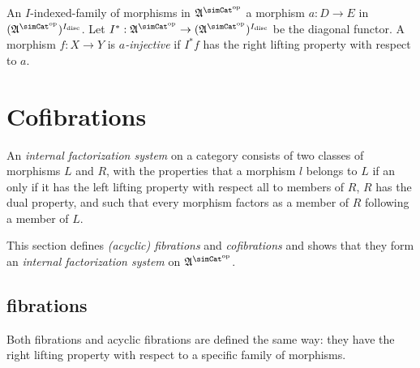 \documentclass{tac}
\newcommand\hide[1]{}
\newcommand\ri{^*}
\newcommand\dual{^{\mathrm{op}}}
\newcommand\disc{_{\mathrm{disc}}}
\newcommand\s{^{\simCat\dual}}
\newcommand\of{:}
\newcommand\ambient{\mathfrak A}
\begin{document}
\hide{
New idea: everything follows form the projectivity of added faces.

We don't need the object of realizers anymore either.

Explain $I\ri\of\ambient\s\to (\ambient\s)^{I\disc}$ somewhere. It should be an internal simplicial object of the slice category. i.e. $(\ambient/I)\s$. 
}
\begin{definition}[Injective] An $I$-indexed-family of morphisms in $\ambient\s$ a morphism $a\of D\to E$ in $(\ambient\s)^{I\disc}$. Let $I\ri\of\ambient\s\to (\ambient\s)^{I\disc}$ be the diagonal functor. A morphism $f\of X\to Y$ is \emph{$a$-injective} if $I\ri f$ has the right lifting property with respect to $a$.
\end{definition}


\section{Cofibrations}%

\begin{definition} An \emph{internal factorization system} on a category consists of two classes of morphisms $L$ and $R$, with the properties that a morphism $l$ belongs to $L$ if an only if it has the left lifting property with respect all to members of $R$, $R$ has the dual property, and such that every morphism factors as a member of $R$ following a member of $L$.\end{definition}

This section defines \emph{(acyclic) fibrations} and \emph{cofibrations} and shows that they form an \emph{internal factorization system} on $\ambient\s$.

\subsection{fibrations}
\hide{ 

Idea: define Kan fibrations, define cofibrations, demonstrate the lifting properties. Move on happily.

New idea: go by factorization system.

1. The lifting properties of cofibrations
2. Factorization property

}
Both fibrations and acyclic fibrations are defined the same way: they have the right lifting property with respect to a specific family of morphisms.
\end{document}
